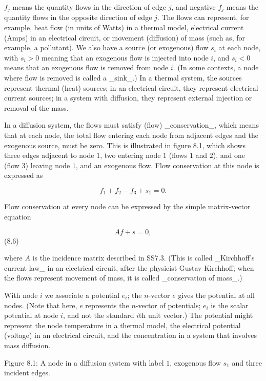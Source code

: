 \(f_{j}\) means the quantity flows in the direction of edge \(j\), and negative \(f_{j}\) means the quantity flows in the opposite direction of edge \(j\). The flows can represent, for example, heat flow (in units of Watts) in a thermal model, electrical current (Amps) in an electrical circuit, or movement (diffusion) of mass (such as, for example, a pollutant). We also have a source (or exogenous) flow \(s_{i}\) at each node, with \(s_{i}>0\) meaning that an exogenous flow is injected into node \(i\), and \(s_{i}<0\) means that an exogenous flow is removed from node \(i\). (In some contexts, a node where flow is removed is called a _sink_.) In a thermal system, the sources represent thermal (heat) sources; in an electrical circuit, they represent electrical current sources; in a system with diffusion, they represent external injection or removal of the mass.

In a diffusion system, the flows must satisfy (flow) _conservation_, which means that at each node, the total flow entering each node from adjacent edges and the exogenous source, must be zero. This is illustrated in figure 8.1, which shows three edges adjacent to node \(1\), two entering node \(1\) (flows \(1\) and \(2\)), and one (flow \(3\)) leaving node \(1\), and an exogenous flow. Flow conservation at this node is expressed as

\[f_{1}+f_{2}-f_{3}+s_{1}=0.\]

Flow conservation at every node can be expressed by the simple matrix-vector equation

\[Af+s=0,\] (8.6)

where \(A\) is the incidence matrix described in SS7.3. (This is called _Kirchhoff's current law_ in an electrical circuit, after the physicist Gustav Kirchhoff; when the flows represent movement of mass, it is called _conservation of mass_.)

With node \(i\) we associate a potential \(e_{i}\); the \(n\)-vector \(e\) gives the potential at all nodes. (Note that here, \(e\) represents the \(n\)-vector of potentials; \(e_{i}\) is the scalar potential at node \(i\), and not the standard \(i\)th unit vector.) The potential might represent the node temperature in a thermal model, the electrical potential (voltage) in an electrical circuit, and the concentration in a system that involves mass diffusion.

Figure 8.1: A node in a diffusion system with label \(1\), exogenous flow \(s_{1}\) and three incident edges.

 